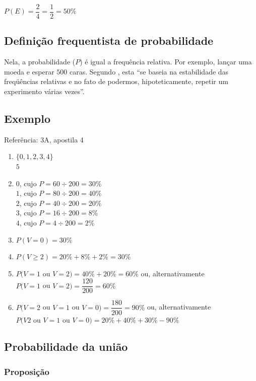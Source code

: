 \documentclass[a4paper]{article}
\begin{document}
	$P(E) = \dfrac{2}{4} = \dfrac{1}{2} = 50\%$
	
	\subsection{Definição frequentista de probabilidade}
	
	Nela, a probabilidade ($P$) é igual a frequência relativa. Por exemplo, lançar uma moeda e esperar $500$ caras. Segundo , esta ``se baseia na estabilidade das freqüências relativas e no fato
	de podermos, hipoteticamente, repetir um experimento várias vezes''.
	
	\subsection{Exemplo}
	
	\noindent Referência: 3A, apostila 4
	
	\begin{enumerate}[label=\alph*.]
		\item $\{0,1,2,3,4\}$ \\ $5$
		\item $0$, cujo $P = 60 \div 200 = 30\%$ \\
			$1$, cujo $P = 80 \div 200 = 40\%$ \\ 
			$2$, cujo $P = 40 \div 200 = 20\%$ \\
			$3$, cujo $P = 16 \div 200 = 8\%$ \\
			$4$, cujo $P = 4 \div 200 = 2\%$
		\item $P(V=0) = 30\%$
		\item $P(V \geq 2) = 20\% + 8\% + 2\% = 30\%$
		\item $P(V=1$ ou $V=2) = 40\% + 20\% = 60\%$ ou, alternativamente \\
			$P(V=1$ ou $V=2) = \dfrac{120}{200} = 60\%$
		\item $P(V=2$ ou $V=1$ ou $V=0) = \dfrac{180}{200} = 90\%$ ou, alternativamente \\
			$P(V2$ ou $V=1$ ou $V=0) = 20\% + 40\% + 30\% - 90\%$
	\end{enumerate}
	
	\subsection{Probabilidade da união}
	
	\subsubsection{Proposição}
	
\end{document}
